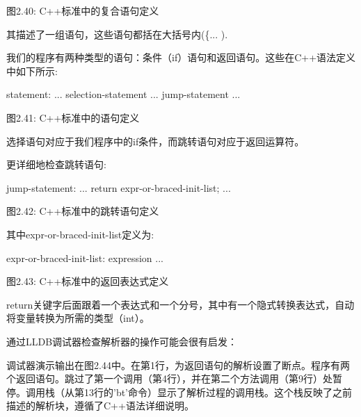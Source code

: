 \begin{center}
图2.40: C++标准中的复合语句定义
\end{center}

其描述了一组语句，这些语句都括在大括号内(\{... ).

我们的程序有两种类型的语句：条件（if）语句和返回语句。这些在C++语法定义中如下所示:

\begin{shell}
statement:
    ...
    selection-statement
    ...
    jump-statement
    ...
\end{shell}

\begin{center}
图2.41: C++标准中的语句定义
\end{center}

选择语句对应于我们程序中的if条件，而跳转语句对应于返回运算符。

更详细地检查跳转语句:

\begin{shell}
jump-statement:
    ...
    return expr-or-braced-init-list;
    ...
\end{shell}

\begin{center}
图2.42: C++标准中的跳转语句定义
\end{center}

其中expr-or-braced-init-list定义为:

\begin{shell}
expr-or-braced-init-list:
    expression
    ...
\end{shell}

\begin{center}
图2.43: C++标准中的返回表达式定义
\end{center}

return关键字后面跟着一个表达式和一个分号，其中有一个隐式转换表达式，自动将变量转换为所需的类型（int）。

通过LLDB调试器检查解析器的操作可能会很有启发：


调试器演示输出在图2.44中。在第1行，为返回语句的解析设置了断点。程序有两个返回语句。跳过了第一个调用（第4行），并在第二个方法调用（第9行）处暂停。调用栈（从第13行的'bt'命令）显示了解析过程的调用栈。这个栈反映了之前描述的解析块，遵循了C++语法详细说明。

